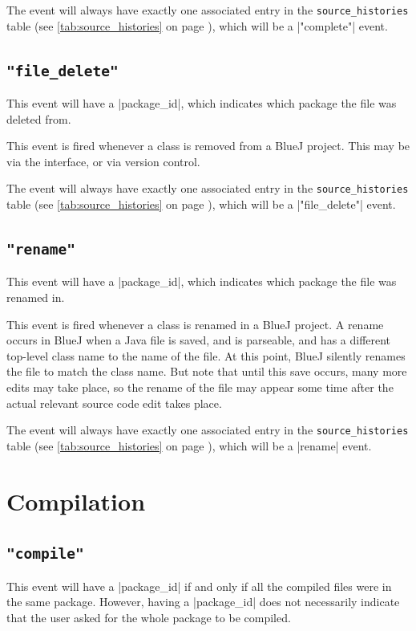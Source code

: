 \documentclass{report}
\newcommand{\myref}[1]{\autoref{#1} on page \pageref*{#1}}
\newcommand{\tabref}[1]{\lstinline|#1| table (see \myref{tab:#1})}
\begin{document}
The event will always have exactly one associated entry in the
\tabref{source_histories}, which will be a |"complete"| event.

\subsection{\lstinline!"file_delete"!}

This event will have a |package_id|, which indicates which package the file
was deleted from.

This event is fired whenever a class is removed from a BlueJ project.  This
may be via the interface, or via version control.

The event will always have exactly one associated entry in the
\tabref{source_histories}, which will be a |"file_delete"| event.

\subsection{\lstinline!"rename"!}

This event will have a |package_id|, which indicates which package the file
was renamed in.

This event is fired whenever a class is renamed in a BlueJ project.  A rename
occurs in BlueJ when a Java file is saved, and is parseable, and has a
different top-level class name to the name of the file.  At this point, BlueJ
silently renames the file to match the class name.  But note that until this
save occurs, many more edits may take place, so the rename of the file may
appear some time after the actual relevant source code edit takes place.

The event will always have exactly one associated entry in the
\tabref{source_histories}, which will be a |rename| event.

\section{Compilation}

\subsection{\lstinline!"compile"!}

This event will have a |package_id| if and only if all the compiled files were
in the same package.  However, having a |package_id| does not necessarily
indicate that the user asked for the whole package to be compiled.
\end{document}
